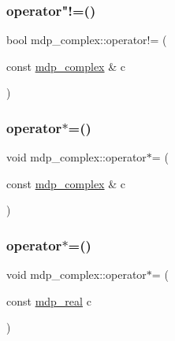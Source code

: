 \mbox{\label{classmdp__complex_ae2e655d313ce4433ca59dcfb59b94cff}} 
\subsubsection{\texorpdfstring{operator"!=()}{operator!=()}}
{\footnotesize\ttfamily bool mdp\+\_\+complex\+::operator!= (\begin{DoxyParamCaption}\item[{const \hyperlink{classmdp__complex}{mdp\+\_\+complex} \&}]{c }\end{DoxyParamCaption})\hspace{0.3cm}{\ttfamily [inline]}}

\mbox{\label{classmdp__complex_a66c98af6209f0a424413f08f75626b61}} 
\subsubsection{\texorpdfstring{operator$\ast$=()}{operator*=()}\hspace{0.1cm}{\footnotesize\ttfamily [1/2]}}
{\footnotesize\ttfamily void mdp\+\_\+complex\+::operator$\ast$= (\begin{DoxyParamCaption}\item[{const \hyperlink{classmdp__complex}{mdp\+\_\+complex} \&}]{c }\end{DoxyParamCaption})\hspace{0.3cm}{\ttfamily [inline]}}

\mbox{\label{classmdp__complex_af073e0a4d5e1dd7495797b42312d35cb}} 
\subsubsection{\texorpdfstring{operator$\ast$=()}{operator*=()}\hspace{0.1cm}{\footnotesize\ttfamily [2/2]}}
{\footnotesize\ttfamily void mdp\+\_\+complex\+::operator$\ast$= (\begin{DoxyParamCaption}\item[{const \hyperlink{mdp__global__vars_8h_a69d96b74c791e0bbdb888b3913a69450}{mdp\+\_\+real}}]{c }\end{DoxyParamCaption})\hspace{0.3cm}{\ttfamily [inline]}}

